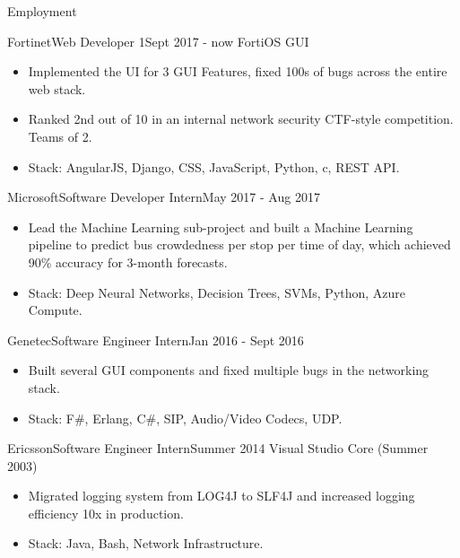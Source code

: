 \documentclass[]{muchicv}
\begin{document}
	\makeheader
	
	\begin{cvsection}{Employment}
		\begin{cvsubsection}{Fortinet}{Web Developer 1}{Sept 2017 - now}
			FortiOS GUI			
			\begin{itemize}
				\item Implemented the UI for 3 GUI Features, fixed 100s of bugs across the entire web stack.
				\item Ranked 2nd out of 10 in an internal network security CTF-style competition. Teams of 2.
				\item Stack: AngularJS, Django, CSS, JavaScript, Python, c, REST API.
			\end{itemize}
		\end{cvsubsection}
		
		\begin{cvsubsection}{Microsoft}{Software Developer Intern}{May 2017 - Aug 2017}	
			\begin{itemize}
				\item Lead the Machine Learning sub-project and built a Machine Learning pipeline to predict bus crowdedness per stop per time of day, which achieved 90\% accuracy for 3-month forecasts.
				\item Stack: Deep Neural Networks, Decision Trees, SVMs, Python, Azure Compute.
			\end{itemize}
		\end{cvsubsection}
		
		\begin{cvsubsection}{Genetec}{Software Engineer Intern}{Jan 2016 - Sept 2016}		
			\begin{itemize}
				\item Built several GUI components and fixed multiple bugs in the networking stack.
				\item Stack: F\#, Erlang, C\#, SIP, Audio/Video Codecs, UDP.
			\end{itemize}
		\end{cvsubsection}
		
		\begin{cvsubsection}{Ericsson}{Software Engineer Intern}{Summer 2014}
			Visual Studio Core (Summer 2003)		
			\begin{itemize}
				\item Migrated logging system from LOG4J to SLF4J and increased logging efficiency 10x in production.
				\item Stack: Java, Bash, Network Infrastructure.
			\end{itemize}
		\end{cvsubsection}
	\end{cvsection}
	
\end{document}
